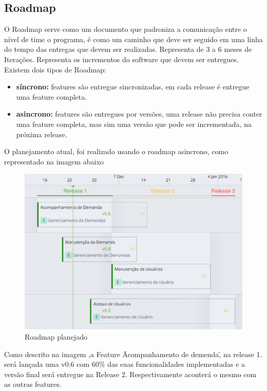 \subsection{Roadmap}

O Roadmap serve como um documento que padroniza a comunicação entre o nível de time o programa,
é como um caminho que deve ser seguido em uma linha do tempo das entregas que devem ser realizadas.
Representa de 3 a 6 meses de Iterações. Representa os incrementos do software que devem ser entregues.
Existem dois tipos de Roadmap: \cite{scaleR}

\begin{itemize}
  \item \textbf{síncrono:} features são entregue sincronizadas, em cada release é entregue uma feature completa.
  \item \textbf{asincrono:} features são entregues por versões, uma release não precisa conter uma feature completa,
   mas sim uma versão que pode ser incrementada, na próxima release.
\end{itemize}

O planejamento atual, foi realizado usando o roadmap asincrono, como representado na imagem abaixo

\begin{figure}[H]
    \centering
	\includegraphics[keepaspectratio=true,scale=0.7]{figuras/roadmap.eps}
    \caption{Roadmap planejado}
    \label{fig:roadmap}
\end{figure}

Como descrito na imagem ,a Feature \"Acompanhamento de demenda\", na release 1.
será lançada uma v0.6 com 60\% das suas funcionalidades implementadas e a versão
final será entregue na Release 2. Respectivamente aconterá o mesmo com as outras features.

